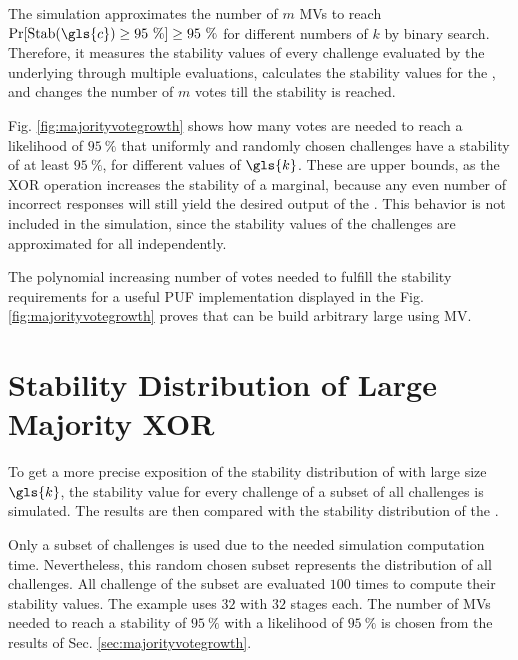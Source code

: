 The simulation approximates the number of $m$ \acp{MV} to reach $\Pr[\protect\Stab(\gls{c}) \ge 95\ \%] \ge 95\ \%$ for different numbers of $k$ by binary search.
Therefore, it measures the stability values of every challenge evaluated by the underlying \mpufs through multiple evaluations, calculates the stability values for the \mxpuf, and changes the number of $m$ votes till the stability is reached.

Fig. \ref{fig:majorityvotegrowth} shows how many votes are needed to reach a likelihood of $95\ \%$ that uniformly and randomly chosen challenges have a stability of at least $95\ \%$, for different values of $\gls{k}$.
These are upper bounds, as the \ac{XOR} operation increases the stability of a \xpuf marginal, because any even number of incorrect \apuf responses will still yield the desired output of the \xpuf. 
This behavior is not included in the simulation, since the stability values of the challenges are approximated for all \apufs independently.

The polynomial increasing number of votes needed to fulfill the stability requirements for a useful PUF implementation displayed in the Fig. \ref{fig:majorityvotegrowth} proves that \xpufs can be build arbitrary large using \ac{MV}.


\section{Stability Distribution of Large Majority \acs{XOR} \apufs}
\label{sec:distributionoflargemxpufs}

To get a more precise exposition of the stability distribution of \mxpufs with large size $\gls{k}$, the stability value for every challenge of a subset of all challenges is simulated.
The results are then compared with the stability distribution of the \apuf.

Only a subset of challenges is used due to the needed simulation computation time.
Nevertheless, this random chosen subset represents the distribution of all challenges. 
All challenge of the subset are evaluated $100$ times to compute their stability values.
The example uses $32$ \mpufs with $32$ stages each.
The number of \acp{MV} needed to reach a stability of $95\ \%$ with a likelihood of $95\ \%$ is chosen from the results of Sec. \ref{sec:majorityvotegrowth}.

